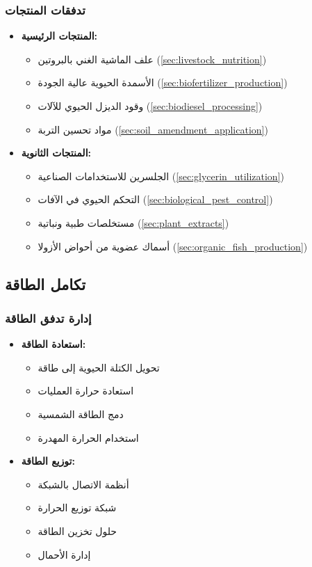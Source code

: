 \subsubsection{تدفقات المنتجات}
\begin{itemize}
    \item \textbf{المنتجات الرئيسية:}
    \begin{itemize}
        \item علف الماشية الغني بالبروتين (\ref{sec:livestock_nutrition})
        \item الأسمدة الحيوية عالية الجودة (\ref{sec:biofertilizer_production})
        \item وقود الديزل الحيوي للآلات (\ref{sec:biodiesel_processing})
        \item مواد تحسين التربة (\ref{sec:soil_amendment_application})
    \end{itemize}
    
    \item \textbf{المنتجات الثانوية:}
    \begin{itemize}
        \item الجلسرين للاستخدامات الصناعية (\ref{sec:glycerin_utilization})
        \item التحكم الحيوي في الآفات (\ref{sec:biological_pest_control})
        \item مستخلصات طبية ونباتية (\ref{sec:plant_extracts})
        \item أسماك عضوية من أحواض الأزولا (\ref{sec:organic_fish_production})
    \end{itemize}
\end{itemize}

\subsection{تكامل الطاقة}

\subsubsection{إدارة تدفق الطاقة}
\begin{itemize}
    \item \textbf{استعادة الطاقة:}
    \begin{itemize}
        \item تحويل الكتلة الحيوية إلى طاقة
        \item استعادة حرارة العمليات
        \item دمج الطاقة الشمسية
        \item استخدام الحرارة المهدرة
    \end{itemize}
    
    \item \textbf{توزيع الطاقة:}
    \begin{itemize}
        \item أنظمة الاتصال بالشبكة
        \item شبكة توزيع الحرارة
        \item حلول تخزين الطاقة
        \item إدارة الأحمال
    \end{itemize}
\end{itemize}

